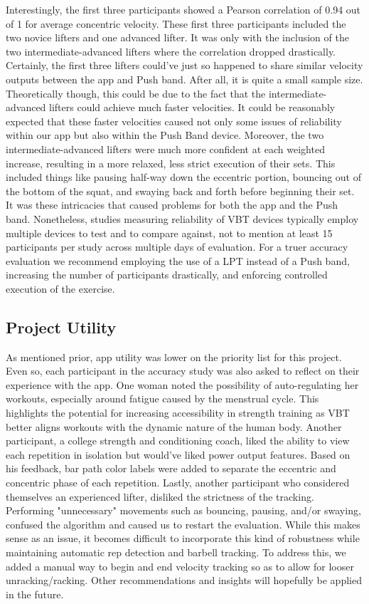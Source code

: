 \documentclass[10pt,twocolumn]{article}
\begin{document}
Interestingly, the first three participants showed a Pearson correlation of 0.94 out of 1 for average concentric velocity.
These first three participants included the two novice lifters and one advanced lifter.
It was only with the inclusion of the two intermediate-advanced lifters where the correlation dropped drastically.
Certainly, the first three lifters could've just so happened to share similar velocity outputs between the app and Push band.
After all, it is quite a small sample size.
Theoretically though, this could be due to the fact that the intermediate-advanced lifters could achieve much faster velocities.
It could be reasonably expected that these faster velocities caused not only some issues of reliability within our app but also within the Push Band device.
Moreover, the two intermediate-advanced lifters were much more confident at each weighted increase, resulting in a more relaxed, less strict execution of their sets.
This included things like pausing half-way down the eccentric portion, bouncing out of the bottom of the squat, and swaying back and forth before beginning their set.
It was these intricacies that caused problems for both the app and the Push band.
Nonetheless, studies measuring reliability of VBT devices typically employ multiple devices to test and to compare against, not to mention at least 15 participants per study across multiple days of evaluation. 
For a truer accuracy evaluation we recommend employing the use of a LPT instead of a Push band, increasing the number of participants drastically, and enforcing controlled execution of the exercise. \par

\subsection{Project Utility}
As mentioned prior, app utility was lower on the priority list for this project.
Even so, each participant in the accuracy study was also asked to reflect on their experience with the app. 
One woman noted the possibility of auto-regulating her workouts, especially around fatigue caused by the menstrual cycle.
This highlights the potential for increasing accessibility in strength training as VBT better aligns workouts with the dynamic nature of the human body.
Another participant, a college strength and conditioning coach, liked the ability to view each repetition in isolation but would've liked power output features.
Based on his feedback, bar path color labels were added to separate the eccentric and concentric phase of each repetition.
Lastly, another participant who considered themselves an experienced lifter, disliked the strictness of the tracking.
Performing "unnecessary" movements such as bouncing, pausing, and/or swaying, confused the algorithm and caused us to restart the evaluation.
While this makes sense as an issue, it becomes difficult to incorporate this kind of robustness while maintaining automatic rep detection and barbell tracking.
To address this, we added a manual way to begin and end velocity tracking so as to allow for looser unracking/racking.
Other recommendations and insights will hopefully be applied in the future. \par
\end{document}
